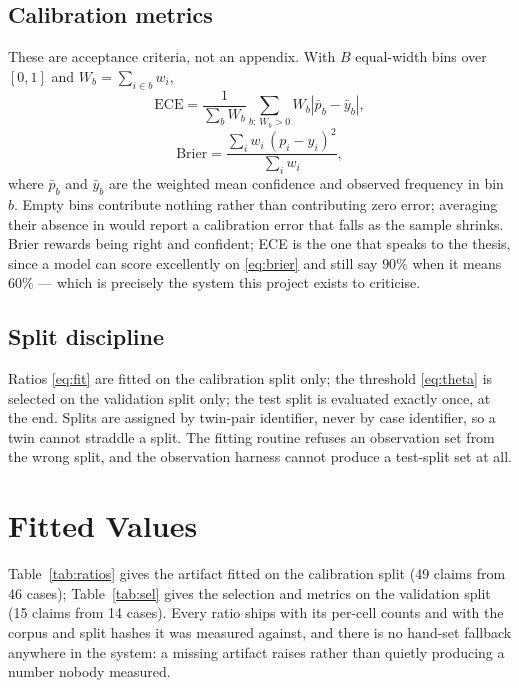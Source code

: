 \documentclass[conference]{IEEEtran}
\begin{document}
\subsection{Calibration metrics}
These are acceptance criteria, not an appendix. With $B$ equal-width bins over $[0,1]$ and
$W_b=\sum_{i \in b} w_i$,
\begin{equation}
\mathrm{ECE} = \frac{1}{\sum_b W_b}\sum_{b:\,W_b>0} W_b \left| \bar{p}_b - \bar{y}_b \right|,
\label{eq:ece}
\end{equation}
\begin{equation}
\mathrm{Brier} = \frac{\sum_i w_i\,(p_i - y_i)^2}{\sum_i w_i},
\label{eq:brier}
\end{equation}
where $\bar{p}_b$ and $\bar{y}_b$ are the weighted mean confidence and observed frequency in
bin $b$. Empty bins contribute nothing rather than contributing zero error; averaging their
absence in would report a calibration error that falls as the sample shrinks. Brier rewards
being right and confident; ECE is the one that speaks to the thesis, since a model can score
excellently on \eqref{eq:brier} and still say $90\%$ when it means $60\%$ --- which is
precisely the system this project exists to criticise.

\subsection{Split discipline}
Ratios \eqref{eq:fit} are fitted on the calibration split only; the threshold \eqref{eq:theta}
is selected on the validation split only; the test split is evaluated exactly once, at the end.
Splits are assigned by twin-pair identifier, never by case identifier, so a twin cannot
straddle a split. The fitting routine refuses an observation set from the wrong split, and the
observation harness cannot produce a test-split set at all.

\section{Fitted Values}
\label{sec:fitted}

Table~\ref{tab:ratios} gives the artifact fitted on the calibration split (49 claims from 46
cases); Table~\ref{tab:sel} gives the selection and metrics on the validation split (15 claims
from 14 cases). Every ratio ships with its per-cell counts and with the corpus and split
hashes it was measured against, and there is no hand-set fallback anywhere in the system: a
missing artifact raises rather than quietly producing a number nobody measured.
\end{document}
